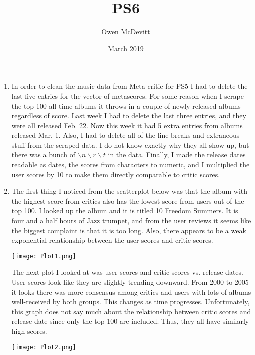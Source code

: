 \documentclass{article}
\title{PS6}
\author{Owen McDevitt}
\date{March 2019}
\begin{document}
\maketitle

\begin{enumerate}
    \item In order to clean the music data from Meta-critic for PS5 I had to delete the last five entries for the vector of metascores. For some reason when I scrape the top 100 all-time albums it throws in a couple of newly released albums regardless of score. Last week I had to delete the last three entries, and they were all released Feb. 22. Now this week it had 5 extra entries from albums released Mar. 1. Also, I had to delete all of the line breaks and extraneous stuff from the scraped data. I do not know exactly why they all show up, but there was a bunch of $\backslash n \backslash r \backslash t$ in the data. Finally, I made the release dates readable as dates, the scores from characters to numeric, and I multiplied the user scores by 10 to make them directly comparable to critic scores.

    \item
    The first thing I noticed from the scatterplot below was that the album with the highest score from critics also has the lowest score from users out of the top 100. I looked up the album and it is titled 10 Freedom Summers. It is four and a half hours of Jazz trumpet, and from the user reviews it seems like the biggest complaint is that it is too long. Also, there appears to be a weak exponential relationship between the user scores and critic scores.

    \begin{center}
        \texttt{[image: Plot1.png]}
    \end{center}

    The next plot I looked at was user scores and critic scores vs. release dates. User scores look like they are slightly trending downward. From 2000 to 2005 it looks there was more consensus among critics and users with lots of albums well-received by both groups. This changes as time progresses. Unfortunately, this graph does not say much about the relationship between critic scores and release date since only the top 100 are included. Thus, they all have similarly high scores.

    \begin{center}
        \texttt{[image: Plot2.png]}
    \end{center}


\end{enumerate}
\end{document}
